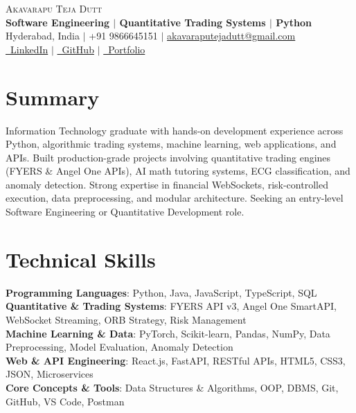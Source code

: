 \documentclass[letterpaper,10pt]{article}
\begin{document}
\begin{center}
    {\Huge \scshape Akavarapu Teja Dutt} \\ \vspace{2pt}
    \textbf{Software Engineering $\vert$ Quantitative Trading Systems $\vert$ Python} \\ \vspace{2pt}
    \small Hyderabad, India $\vert$ +91 9866645151 $\vert$ \href{mailto:akavaraputejadutt@gmail.com}{akavaraputejadutt@gmail.com} \\ \vspace{2pt}
    \href{https://linkedin.com/in/teja-dutt-akavarapu-b755a9249}{\faLinkedin\ LinkedIn} $\vert$
    \href{https://github.com/AkavarapuTejadutt}{\faGithub\ GitHub} $\vert$
    \href{https://akavaraputejadutt.github.io/}{\faGlobe\ Portfolio}
\end{center}

\vspace{-8pt}
\section{Summary}
\small{
Information Technology graduate with hands-on development experience across Python, algorithmic trading systems, machine learning, web applications, and APIs. Built production-grade projects involving quantitative trading engines (FYERS \& Angel One APIs), AI math tutoring systems, ECG classification, and anomaly detection. Strong expertise in financial WebSockets, risk-controlled execution, data preprocessing, and modular architecture. Seeking an entry-level Software Engineering or Quantitative Development role.
}

\vspace{-4pt}
\section{Technical Skills}
\begin{itemize}[leftmargin=0.15in, label={}]
    \small{\item{
     \textbf{Programming Languages}{: Python, Java, JavaScript, TypeScript, SQL} \\
     \textbf{Quantitative \& Trading Systems}{: FYERS API v3, Angel One SmartAPI, WebSocket Streaming, ORB Strategy, Risk Management} \\
     \textbf{Machine Learning \& Data}{: PyTorch, Scikit-learn, Pandas, NumPy, Data Preprocessing, Model Evaluation, Anomaly Detection} \\
     \textbf{Web \& API Engineering}{: React.js, FastAPI, RESTful APIs, HTML5, CSS3, JSON, Microservices} \\
     \textbf{Core Concepts \& Tools}{: Data Structures \& Algorithms, OOP, DBMS, Git, GitHub, VS Code, Postman}
    }}
\end{itemize}
\end{document}
